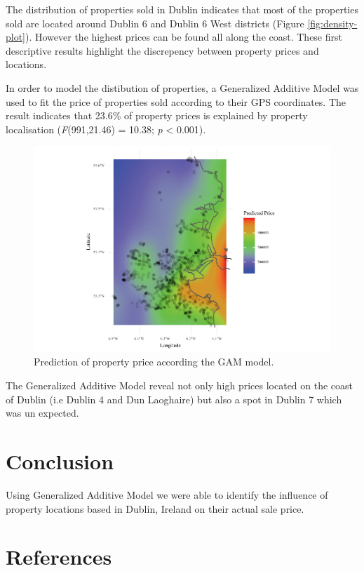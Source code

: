\documentclass[]{elsarticle} %
\begin{document}
The distribution of properties sold in Dublin indicates that most of the
properties sold are located around Dublin 6 and Dublin 6 West districts
(Figure \ref{fig:density-plot}). However the highest prices can be found
all along the coast. These first descriptive results highlight the
discrepency between property prices and locations.

In order to model the distibution of properties, a Generalized Additive
Model was used to fit the price of properties sold according to their
GPS coordinates. The result indicates that 23.6\% of property prices is
explained by property localisation (\emph{F}(991,21.46) = 10.38;
\emph{p} \textless{} 0.001).

\begin{figure}[H]

\includegraphics{property_price_paper_files/figure-latex/gam-plot-1} \hfill{}

\caption{Prediction of property price according the GAM model.}\label{fig:gam-plot}
\end{figure}

The Generalized Additive Model reveal not only high prices located on
the coast of Dublin (i.e Dublin 4 and Dun Laoghaire) but also a spot in
Dublin 7 which was un expected.

\section{Conclusion}\label{conclusion}

Using Generalized Additive Model we were able to identify the influence
of property locations based in Dublin, Ireland on their actual sale
price.

\section*{References}\label{references}
\end{document}
